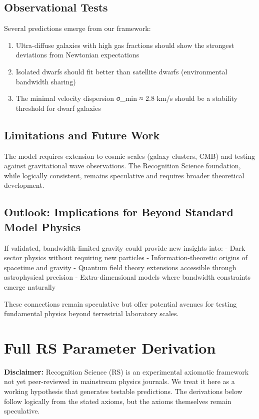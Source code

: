 \documentclass[twocolumn,prd,amsmath,amssymb,aps,superscriptaddress,nofootinbib]{revtex4-2}
\begin{document}
\subsection{Observational Tests}

Several predictions emerge from our framework:
\begin{enumerate}
\item Ultra-diffuse galaxies with high gas fractions should show the strongest deviations from Newtonian expectations
\item Isolated dwarfs should fit better than satellite dwarfs (environmental bandwidth sharing)
\item The minimal velocity dispersion σ_min ≈ 2.8 km/s should be a stability threshold for dwarf galaxies
\end{enumerate}

\subsection{Limitations and Future Work}

The model requires extension to cosmic scales (galaxy clusters, CMB) and testing against gravitational wave observations. The Recognition Science foundation, while logically consistent, remains speculative and requires broader theoretical development.

\subsection{Outlook: Implications for Beyond Standard Model Physics}

If validated, bandwidth-limited gravity could provide new insights into:
- Dark sector physics without requiring new particles
- Information-theoretic origins of spacetime and gravity  
- Quantum field theory extensions accessible through astrophysical precision
- Extra-dimensional models where bandwidth constraints emerge naturally

These connections remain speculative but offer potential avenues for testing fundamental physics beyond terrestrial laboratory scales.

\appendix
\section{Full RS Parameter Derivation}
\label{app:derivation}

\textbf{Disclaimer:} Recognition Science (RS) is an experimental axiomatic framework not yet peer-reviewed in mainstream physics journals. We treat it here as a working hypothesis that generates testable predictions. The derivations below follow logically from the stated axioms, but the axioms themselves remain speculative.
\end{document}
